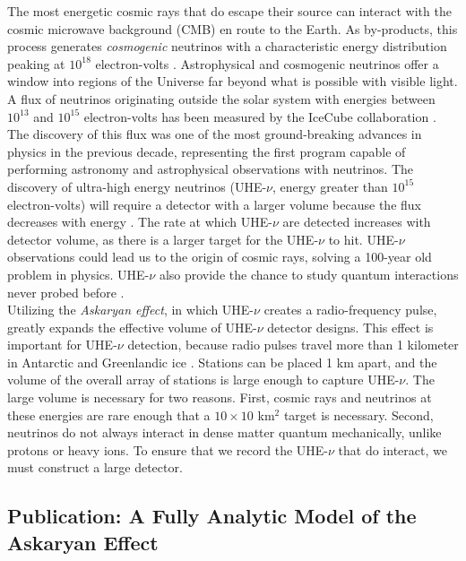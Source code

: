 \documentclass[../../../main.tex]{subfiles}
\begin{document}
The most energetic cosmic rays that do escape their source can interact with the cosmic microwave background (CMB) en route to the Earth.  As by-products, this process generates \textit{cosmogenic} neutrinos with a characteristic energy distribution peaking at $10^{18}$ electron-volts \cite{10.1007/bf00645585} \cite{BERESINSKY1969423}.  Astrophysical and cosmogenic neutrinos offer a window into regions of the Universe far beyond what is possible with visible light.  A flux of neutrinos originating outside the solar system with energies between $10^{13}$ and $10^{15}$ electron-volts has been measured by the IceCube collaboration \cite{PhysRevLett.111.021103}. The discovery of this flux was one of the most ground-breaking advances in physics in the previous decade, representing the first program capable of performing astronomy and astrophysical observations with neutrinos.  The discovery of ultra-high energy neutrinos (UHE-$\nu$, energy greater than $10^{15}$ electron-volts) will require a detector with a larger volume because the flux decreases with energy \cite{PhysRevD.98.062003}.  The rate at which UHE-$\nu$ are detected increases with detector volume, as there is a larger target for the UHE-$\nu$ to hit.  UHE-$\nu$ observations could lead us to the origin of cosmic rays, solving a 100-year old problem in physics.  UHE-$\nu$ also provide the chance to study quantum interactions never probed before \cite{Astro2020_1} \cite{Astro2020_2}.
\\
\vspace{0.15cm}
Utilizing the \textit{Askaryan effect}, in which UHE-$\nu$ creates a radio-frequency pulse, greatly expands the effective volume of UHE-$\nu$ detector designs.  This effect is important for UHE-$\nu$ detection, because radio pulses travel more than 1 kilometer in Antarctic and Greenlandic ice \cite{10.3189/2015jog14j214,10.3189/2015jog15j057,10.1002/2015rs005849,10.1016/j.astropartphys.2011.11.010}.  Stations can be placed 1 km apart, and the volume of the overall array of stations is large enough to capture UHE-$\nu$.  The large volume is necessary for two reasons.  First, cosmic rays and neutrinos at these energies are rare enough that a $10 \times 10$ km$^2$ target is necessary.  Second, neutrinos do not always interact in dense matter quantum mechanically, unlike protons or heavy ions.  To ensure that we record the UHE-$\nu$ that do interact, we must construct a large detector.

\subsection{Publication: A Fully Analytic Model of the Askaryan Effect}
\end{document}
